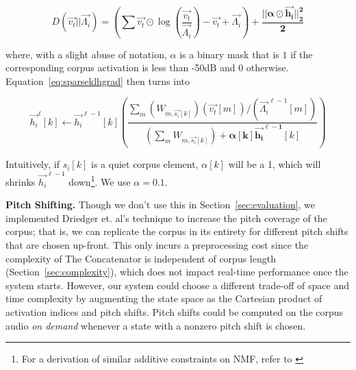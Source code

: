 \documentclass{article}
\begin{document}
\begin{equation}
    \label{eq:kllossalpha}
    D(\vec{v_t} || \vec{\Lambda_i}) = \left( \sum \vec{v_t} \odot \log \left( \frac{\vec{v_t}}{\vec{\Lambda_i}} \right) - \vec{v_t} + \vec{\Lambda_i} \right) + \boldsymbol{ \frac{||\alpha \odot \vec{h_i}||_2^2 }{2} }
    \end{equation}

where, with a slight abuse of notation, $\alpha$ is a binary mask that is $1$ if the corresponding corpus activation is less than -50dB and $0$ otherwise.  Equation~\ref{eq:sparseklhgrad} then turns into 

\begin{equation}
    \label{eq:sparseklhgradalpha}
    \vec{h_i}^{\ell}[k]  \gets \vec{h_i}^{\ell-1}[k] \left(  \frac{\sum_m (W_{m, \vec{s_i}[k]}) (\vec{v_t}[m]) / (\vec{\Lambda_i}^{\ell-1}[m]) }{ (\sum_{m} W_{m, \vec{s_i}[k]}) + \boldsymbol{ \alpha[k] \vec{h_i}^{\ell-1}}[k]} \right)
\end{equation}

Intuitively, if $s_i[k]$ is a quiet corpus element, $\alpha[k]$ will be a 1, which will shrinks $\vec{h_i}^{\ell-1}$ down\footnote{For a derivation of similar additive constraints on NMF, refer to \cite{virtanen2007monaural}}.  We use $\alpha=0.1$.




\textbf{Pitch Shifting.} Though we don't use this in Section~\ref{sec:evaluation}, we implemented Driedger et. al's technique to increase the pitch coverage of the corpus; that is, we can replicate the corpus in its entirety for different pitch shifts that are chosen up-front.  This only incurs a preprocessing cost since the complexity of The Concatenator is independent of corpus length (Section~\ref{sec:complexity}), which does not impact real-time performance once the system starts.  However, our system could choose a different trade-off of space and time complexity by augmenting the state space as the Cartesian product of activation indices and pitch shifts.  Pitch shifts could be computed on the corpus audio {\em on demand} whenever a state with a nonzero pitch shift is chosen.
\end{document}
